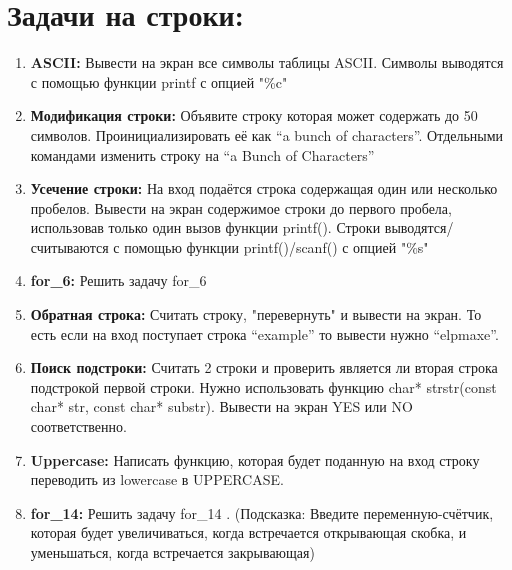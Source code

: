 \documentclass{article}
\begin{document}

\section*{Задачи на строки:}
\begin{enumerate}
\item \textbf{ASCII:} Вывести на экран все символы таблицы ASCII. Символы выводятся с помощью функции printf с опцией "\%c"
\item \textbf{Модификация строки:} Объявите строку которая может содержать до 50 символов. Проинициализировать её как ``a bunch of characters''. Отдельными командами изменить строку на ``a Bunch of Characters''
\item \textbf{Усечение строки:} На вход подаётся строка содержащая один или несколько пробелов. Вывести на экран содержимое строки до первого пробела, использовав только один вызов функции printf(). Строки выводятся/считываются с помощью функции printf()/scanf() с опцией "\%s"
\item \textbf{for\_6:} Решить задачу for\_6
\item \textbf{Обратная строка:} Считать строку, "перевернуть" и вывести на экран. То есть если на вход поступает строка ``example''  то вывести нужно ``elpmaxe''.
\item \textbf{Поиск подстроки:} Считать 2 строки и проверить является ли вторая строка подстрокой первой строки. Нужно использовать функцию char* strstr(const char* str, const char* substr). Вывести на экран YES или NO соответственно.
\item \textbf{Uppercase:} Написать функцию, которая будет поданную на вход строку переводить из lowercase в UPPERCASE.
\item \textbf{for\_14:} Решить задачу for\_14 . (Подсказка: Введите переменную-счётчик, которая будет увеличиваться, когда встречается открывающая скобка, и уменьшаться, когда встречается закрывающая)
\end{enumerate}

\vfil
\end{document}
